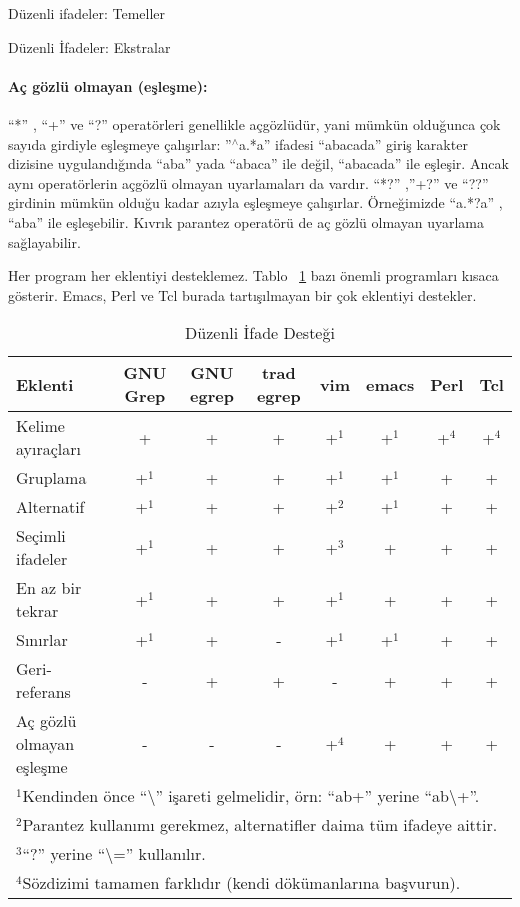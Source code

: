 \begin{section}{Düzenli ifadeler: Temeller}
\begin{subsection}{Düzenli İfadeler: Ekstralar}
\paragraph{Aç gözlü olmayan (eşleşme):}{“*” , “+” ve “?” operatörleri genellikle açgözlüdür, yani mümkün olduğunca çok sayıda girdiyle eşleşmeye çalışırlar: ”$ ^\wedge $a.*a” ifadesi “abacada” giriş karakter dizisine uygulandığında “aba” yada “abaca” ile değil, “abacada” ile eşleşir. Ancak aynı operatörlerin açgözlü olmayan uyarlamaları da vardır. “*?” ,”+?” ve “??” girdinin mümkün olduğu kadar azıyla eşleşmeye çalışırlar. Örneğimizde “a.*?a” , “aba” ile eşleşebilir. Kıvrık parantez operatörü de aç gözlü olmayan uyarlama sağlayabilir.}
 
Her program her eklentiyi desteklemez. Tablo ~\ref{tab:7.1} bazı önemli programları kısaca gösterir. Emacs, Perl ve Tcl burada tartışılmayan bir çok eklentiyi destekler.

\begin {table}[htb]\footnotesize
\caption {Düzenli İfade Desteği} \label{tab:7.1}
\begin{tabular}{l*{7}{c}}
\hline
Eklenti & GNU Grep & GNU egrep & trad egrep & vim & emacs & Perl & Tcl \\
\hline
Kelime ayıraçları & + & + & + & +$^1$ & +$^1$ & +$^4$ & +$^4$ \\
Gruplama & +$^1$ & + & + & +$^1$ & +$^1$ & + & + \\
Alternatif & +$^1$ & + & + & +$^2$ & +$^1$ & + & + \\
Seçimli ifadeler & +$^1$ & + & + & +$^3$ & + & + & + \\
En az bir tekrar & +$^1$ & + & + & +$^1$ & + & + & + \\
Sınırlar & +$^1$ & + & - & +$^1$ & +$^1$ & + & + \\
Geri-referans & - & + & + & - & + & + & + \\
Aç gözlü olmayan eşleşme & - & - & - & +$^4$ & + & + & + \\
\hline
\multicolumn{8}{l}{$^1$Kendinden önce “\textbackslash” işareti gelmelidir, örn: “ab+” yerine “ab\textbackslash+”.} \\
\multicolumn{8}{l}{$^2$Parantez kullanımı gerekmez, alternatifler daima tüm ifadeye aittir.} \\
\multicolumn{8}{l}{$^3$“?” yerine “\textbackslash=” kullanılır.} \\
\multicolumn{8}{l}{$^4$Sözdizimi tamamen farklıdır (kendi dökümanlarına başvurun).} \\
\end{tabular}
\end {table}

\end{subsection}
\end{section}
